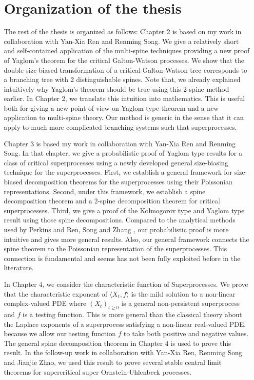 \documentclass[UTF8]{pkuthss}
\theoremstyle{plain}
\theoremstyle{definition}
\numberwithin{equation}{section}
\begin{document}
\section{Organization of the thesis}
	The rest of the thesis is organized as follows:
	Chapter 2 is based on my work \cite{RenSongSun2018A-2-spine} in collaboration with Yan-Xia Ren and Renming Song.
    We give a relatively short and self-contained application of the multi-spine techniques providing a new proof of Yaglom's theorem for the critical Galton-Watson processes. 
    We show that the double-size-biased transformation of a critical Galton-Watson tree corresponds to a branching tree with 2 distinguishable spines. 
    Note that, we already explained intuitively why Yaglom's theorem should be true using this 2-spine method earlier. 
    In Chapter 2, we translate this intuition into mathematics. 
    This is useful both for giving a new point of view on Yaglom type theorem and a new application to multi-spine theory. 
    Our method is generic in the sense that it can apply to much more complicated branching systems such that superprocesses. 

    Chapter 3 is based my work \cite{RenSongSun2017Spine} in collaboration with Yan-Xia Ren and Renming Song. In that chapter, we give a probabilistic proof of Yaglom type results for a class of critical superprocesses using a newly developed general size-biasing technique for the superprocesses. First, we establish a general framework for size-biased decomposition theorems for the superprocesses using their Poissonian representations. Second, under this framework, we establish a spine decomposition theorem and a 2-spine decomposition theorem for critical superprocesses. Third, we give a proof of the Kolmogorov type and Yaglom type result using those spine decompositions.  Compared to the analytical methods used by Perkins \cite{EvansPerkins1990Measure-valued} and Ren, Song and Zhang \cite{RenSongZhang2015Limit}, our probabilistic proof is more intuitive and gives more general results. Also, our general framework connects the spine theorem to the Poissonian representation of the superprocesses. This connection is fundamental and seems has not been fully exploited before in the literature. 

    In Chapter 4, we consider the characteristic function of Superprocesses. 
    We prove that the characteristic exponent of $\langle X_t,f\rangle$ is the mild solution to a non-linear complex-valued PDE where $(X_t)_{t\geq 0}$ is a general non-persistent superprocess and $f$ is a testing function. 
    This is more general than the classical theory about the Laplace exponents of a superprocess satisfying a non-linear real-valued PDE, because we allow our testing function $f$ to take both positive and negative values. 
    The general spine decomposition theorem in Chapter 4 is used to prove this result. In the follow-up work \cite{RenSongSunZhao2019Stable} in collaboration with Yan-Xia Ren, Renming Song and Jianjie Zhao, we used this result to prove several stable central limit theorems for supercritical super Ornstein-Uhlenbeck processes.
    
\end{document}
